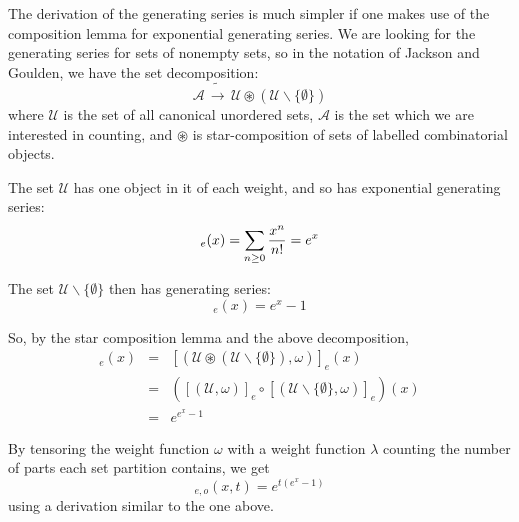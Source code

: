 \documentclass[12pt]{article}
\begin{document}
The derivation of the generating series is much simpler if one makes use of the composition lemma for exponential generating series. We are looking for the generating series for sets of nonempty sets, so in the notation of Jackson and Goulden, we have the set decomposition:
\begin{displaymath}
\mathcal{A}\,\tilde\longrightarrow\, \mathcal{U} \circledast (\mathcal{U} \backslash \{\emptyset\})
\end{displaymath}
where $\mathcal{U}$ is the set of all canonical unordered sets, $\mathcal{A}$ is the set which we are interested in counting, and $\circledast$ is star-composition of sets of labelled combinatorial objects.

The set $\mathcal{U}$ has one object in it of each weight, and so has exponential generating series:
\begin{displaymath}
[(\mathcal{U}, \omega)]_e (x) = \sum_{n\geq 0} {x^n\over n!} = e^x
\end{displaymath}

The set $\mathcal{U} \backslash \{\emptyset\}$ then has generating series:
\begin{displaymath}
[(\mathcal{U} \backslash \{\emptyset\}, \omega)]_e (x) = e^x - 1
\end{displaymath}

So, by the star composition lemma and the above decomposition,
\begin{eqnarray*}
[(\mathcal{A}, \omega)]_e (x) &=& [(\mathcal{U} \circledast (\mathcal{U} \backslash \{\emptyset\}), \omega)]_e (x)\\
&=&\left([(\mathcal{U}, \omega)]_e \circ [(\mathcal{U} \backslash \{\emptyset\}, \omega)]_e\right) (x)\\
&=&e^{e^x - 1}
\end{eqnarray*}

By tensoring the weight function $\omega$ with a weight function $\lambda$ counting the number of parts each set partition contains, we get
\begin{displaymath}
[(\mathcal{A}, \omega \otimes \lambda)]_{e,o} (x,t) = e^{t (e^x - 1)}
\end{displaymath}
using a derivation similar to the one above.
\end{document}
